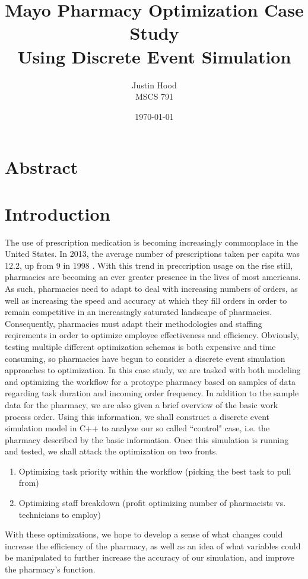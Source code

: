 \documentclass[10pt]{report}            %
\title{\bf Mayo Pharmacy Optimization Case Study\\
\large Using Discrete Event Simulation}  %
\author{Justin Hood\\
MSCS 791}              %
\date{\today}                           %
\begin{document}
\maketitle                              %
\setcounter{page}{2}                    %
\newpage
\section*{Abstract}
\section*{Introduction}                %
The use of prescription medication is becoming increasingly commonplace in the United States. In 2013, the average number of prescriptions taken per capita was $12.2$, up from $9$ in 1998 \cite{georgetown}\cite{statistica}. With this trend in preccription usage on the rise still, pharmacies are becoming an ever greater presence in the lives of most americans. As such, pharmacies need to adapt to deal with increasing numbers of orders, as well as increasing the speed and accuracy at which they fill orders in order to remain competitive in an increasingly saturated landscape of pharmacies.  Consequently, pharmacies must adapt their methodologies and staffing reqirements in order to optimize employee effectiveness and efficiency. Obviously, testing multiple different optimization schemas is both expensive and time consuming, so pharmacies have begun to consider a discrete event simulation approaches to optimization. In this case study, we are tasked with both modeling and optimizing the workflow for a protoype pharmacy based on samples of data regarding task duration and incoming order frequency. In addition to the sample data for the pharmacy, we are also given a brief overview of the basic work process order. Using this information, we shall construct a discrete event simulation model in C++ to analyze our so called ``control" case, i.e. the pharmacy described by the basic information. Once this simulation is running and tested, we shall attack the optimization on two fronts.
\begin{enumerate}
\item Optimizing task priority within the workflow (picking the best task to pull from)
\item Optimizing staff breakdown (profit optimizing number of pharmacists vs. technicians to employ)
\end{enumerate}
With these optimizations, we hope to develop a sense of what changes could increase the efficiency of the pharmacy, as well as an idea of what variables could be manipulated to further increase the accuracy of our simulation, and improve the pharmacy's function.
\end{document}
